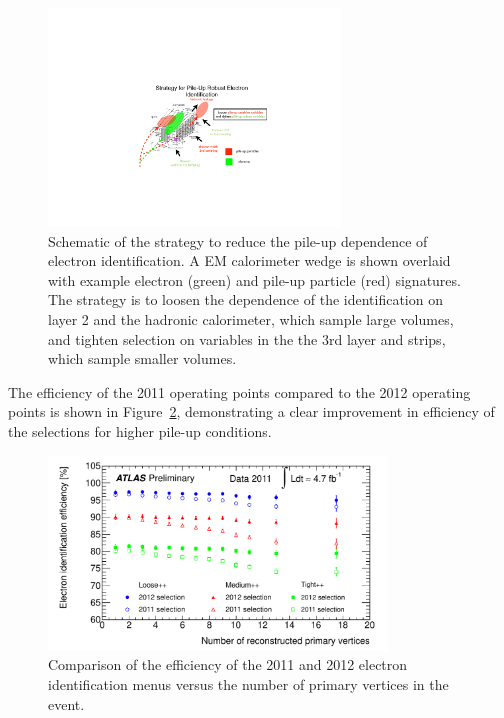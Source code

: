 \begin{figure}[!t]
\centering 
\includegraphics[width=0.69\textwidth]{figs/electron/schematic_pileup}
\caption{Schematic of the strategy to reduce the pile-up dependence of electron identification. A EM calorimeter wedge is shown overlaid with example electron (green) and pile-up particle (red) signatures. The strategy is to loosen the dependence of the identification on layer 2 and the hadronic calorimeter, which sample large volumes, and tighten selection on variables in the the 3rd layer and strips, which sample smaller volumes.} 
\label{figure:electron_schematic}
\end{figure}


The efficiency of the 2011 operating points compared to the 2012 operating points is shown in Figure~\ref{figure:electron_2012_2011}, demonstrating a clear improvement in efficiency of the selections for higher pile-up conditions.

\begin{figure}[!t]
\centering 
\includegraphics[width=0.80\textwidth]{figs/electron/data_effPP_vs_pvx}
\caption{Comparison of the efficiency of the 2011 and 2012 electron identification menus versus the number of primary vertices in the event.}
\label{figure:electron_2012_2011}
\end{figure}


